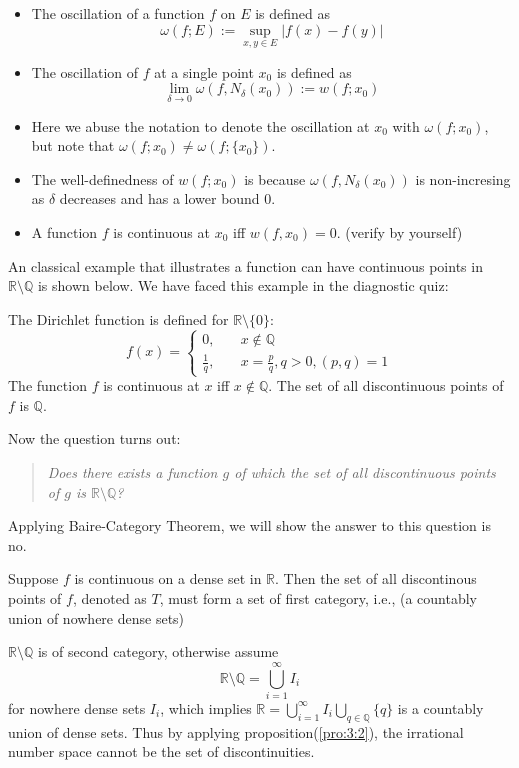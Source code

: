 \begin{definition}[oscillation]
\begin{itemize}
\item
The oscillation of a function $f$ on $E$ is defined as
\[
\omega(f;E) := \sup_{x,y\in E}|f(x) - f(y)|
\]
\item
The oscillation of $f$ at a single point $x_0$ is defined as
\[
\lim_{\delta\to0}\omega(f,N_\delta(x_0)) := w(f;x_0)
\]
\end{itemize}
\end{definition}
\begin{remark}
\begin{itemize}
\item
Here we abuse the notation to denote the oscillation at $x_0$ with $\omega(f;x_0)$, but note that $\omega(f;x_0)\ne \omega(f;\{x_0\})$.
\item
The well-definedness of $w(f;x_0)$ is because $\omega(f,N_\delta(x_0))$ is non-incresing as $\delta$ decreases and has a lower bound $0$.
\item
A function $f$ is continuous at $x_0$ iff $w(f,x_0) = 0$. (verify by yourself)
\end{itemize}
\end{remark}
An classical example that illustrates a function can have continuous points in $\mathbb{R}\setminus\mathbb{Q}$ is shown below. We have faced this example in the diagnostic quiz:
\begin{example}
The Dirichlet function is defined for $\mathbb{R}\setminus\{0\}$:
\[
f(x) = \left\{
\begin{aligned}
0,&\quad x\notin\mathbb{Q}\\
\frac{1}{q},&\quad x=\frac{p}{q},q>0,(p,q)=1
\end{aligned}
\right.
\]
The function $f$ is continuous at $x$ iff $x\notin\mathbb{Q}$. 
The set of all discontinuous points of $f$ is $\mathbb{Q}$. 
\end{example}
Now the question turns out:
\begin{quotation}
\textit{
Does there exists a function $g$ of which the set of all discontinuous points of $g$ is $\mathbb{R}\setminus\mathbb{Q}$?
}
\end{quotation}

Applying Baire-Category Theorem, we will show the answer to this question is no.

\begin{proposition}\label{pro:3:2}
Suppose $f$ is continuous on a dense set in $\mathbb{R}$. Then the set of all discontinous points of $f$, denoted as $T$, must form a set of first category, i.e., (a countably union of nowhere dense sets)
\end{proposition}
\begin{remark}
$\mathbb{R}\setminus\mathbb{Q}$ is of second category, otherwise assume
\[
\mathbb{R}\setminus\mathbb{Q}=\bigcup_{i=1}^\infty I_i
\]
for nowhere dense sets $I_i$, which implies $\mathbb{R}=\bigcup_{i=1}^\infty I_i\bigcup_{q\in\mathbb{Q}}\{q\}$ is a countably union of dense sets. Thus by applying proposition(\ref{pro:3:2}), the irrational number space cannot be the set of discontinuities.
\end{remark}

